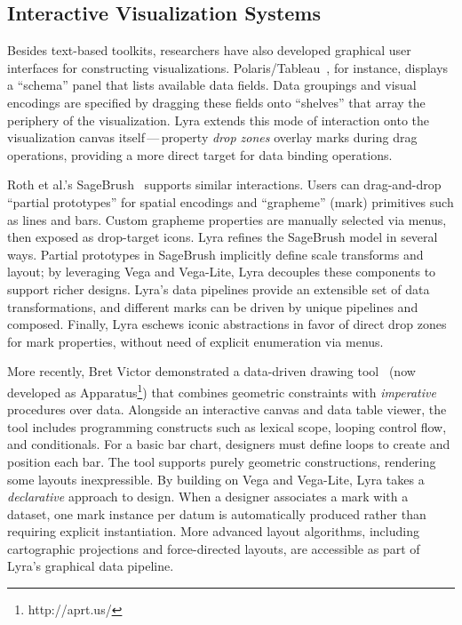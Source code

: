 \vspace{-10pt}

\subsection{Interactive Visualization Systems}

Besides text-based toolkits, researchers have also developed graphical user
interfaces for constructing visualizations.
Polaris/Tableau~\cite{stolte:polaris}, for instance, displays a ``schema'' panel
that lists available data fields. Data groupings and visual encodings are
specified by dragging these fields onto ``shelves'' that array the periphery of
the visualization. Lyra extends this mode of interaction onto the visualization
canvas itself\,---\,property \emph{drop zones} overlay marks during drag
operations, providing a more direct target for data binding operations.

Roth et al.'s SageBrush~\cite{roth:sagebrush} supports similar interactions.
Users can drag-and-drop ``partial prototypes'' for spatial encodings and
``grapheme'' (mark) primitives such as lines and bars. Custom grapheme
properties are manually selected via menus, then exposed as drop-target icons.
Lyra refines the SageBrush model in several ways. Partial prototypes in
SageBrush implicitly define scale transforms and layout; by leveraging Vega and
Vega-Lite, Lyra decouples these components to support richer designs. Lyra's
data pipelines provide an extensible set of data transformations, and different
marks can be driven by unique pipelines and composed. Finally, Lyra eschews
iconic abstractions in favor of direct drop zones for mark properties, without
need of explicit enumeration via menus.

More recently, Bret Victor demonstrated a data-driven drawing
tool~\cite{victor:drawing} (now developed as
Apparatus\footnote{http://aprt.us/}) that combines geometric constraints with
\emph{imperative} procedures over data. Alongside an interactive canvas and data
table viewer, the tool includes programming constructs such as lexical scope,
looping control flow, and conditionals. For a basic bar chart, designers must
define loops to create and position each bar. The tool supports purely geometric
constructions, rendering some layouts inexpressible. By building on Vega and
Vega-Lite, Lyra takes a \emph{declarative} approach to design. When a designer
associates a mark with a dataset, one mark instance per datum is automatically
produced rather than requiring explicit instantiation. More advanced layout
algorithms, including cartographic projections and force-directed layouts, are
accessible as part of Lyra's graphical data pipeline.


